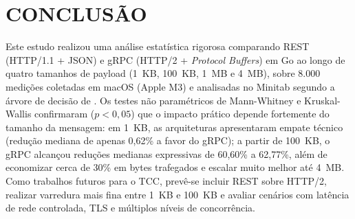 \documentclass[a4paper, 12pt]{article}
\begin{document}
\section{CONCLUSÃO}

Este estudo realizou uma análise estatística rigorosa comparando REST (HTTP/1.1 + JSON) e gRPC (HTTP/2 + \textit{Protocol Buffers}) em Go ao longo de quatro tamanhos de payload (1~KB, 100~KB, 1~MB e 4~MB), sobre 8.000 medições coletadas em macOS (Apple M3) e analisadas no Minitab segundo a árvore de decisão de . Os testes não paramétricos de Mann-Whitney e Kruskal-Wallis confirmaram ($p < 0{,}05$) que o impacto prático depende fortemente do tamanho da mensagem: em 1~KB, as arquiteturas apresentaram empate técnico (redução mediana de apenas 0,62\% a favor do gRPC); a partir de 100~KB, o gRPC alcançou reduções medianas expressivas de 60,60\% a 62,77\%, além de economizar cerca de 30\% em bytes trafegados e escalar muito melhor até 4~MB. Como trabalhos futuros para o TCC, prevê-se incluir REST sobre HTTP/2, realizar varredura mais fina entre 1~KB e 100~KB e avaliar cenários com latência de rede controlada, TLS e múltiplos níveis de concorrência.


\end{document}
